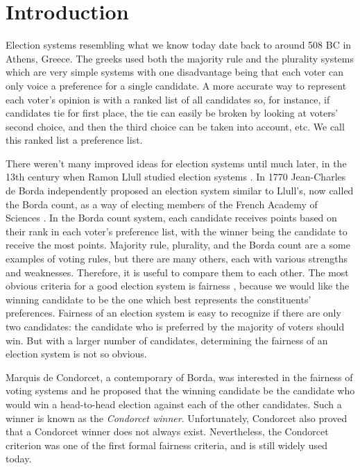 
\chapter{Introduction}


	Election systems resembling what we know today date back to around 508 BC in Athens, Greece. The greeks used both the majority rule and the plurality systems which are very simple systems with one disadvantage being that each voter can only voice a preference for a single candidate. A more accurate way to represent each voter's opinion is with a ranked list of all candidates so, for instance, if candidates tie for first place, the tie can easily be broken by looking at voters' second choice, and then the third choice can be taken into account, etc. We call this ranked list a preference list.

	There weren't many improved ideas for election systems until much later, in the 13th century when Ramon Llull studied election systems \cite{hägele2001llull}. In 1770 Jean-Charles de Borda independently proposed an election system similar to Llull's, now called the Borda count, as a way of electing members of the French Academy of Sciences \cite{borda1781mémoire}. In the Borda count system, each candidate receives points based on their rank in each voter's preference list, with the winner being the candidate to receive the most points. Majority rule, plurality, and the Borda count are a some examples of voting rules, but there are many others, each with various strengths and weaknesses. Therefore, it is useful to compare them to each other. The most obvious criteria for a good election system is fairness \cite{chevaleyre2006issues}, because we would like the winning candidate to be the one which best represents the constituents' preferences. Fairness of an election system is easy to recognize if there are only two candidates: the candidate who is preferred by the majority of voters should win. But with a larger number of candidates, determining the fairness of an election system is not so obvious.

	Marquis de Condorcet, a contemporary of Borda, was interested in the fairness of voting systems and he proposed that the winning candidate be the candidate who would win a head-to-head election against each of the other candidates. Such a winner is known as the \emph{Condorcet winner}. Unfortunately, Condorcet also proved that a Condorcet winner does not always exist. Nevertheless, the Condorcet criterion was one of the first formal fairness criteria, and is still widely used today.


